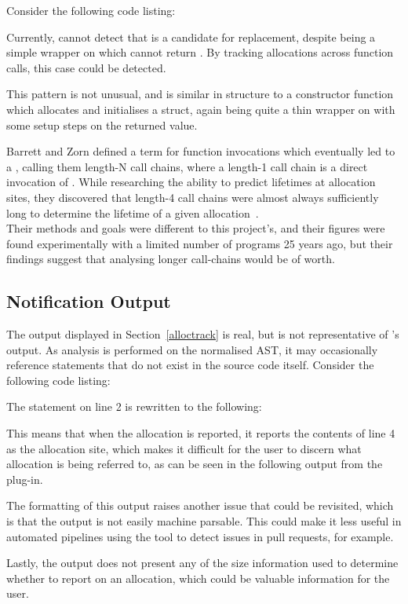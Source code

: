 Consider the following code listing:



Currently,  cannot detect that  is a candidate for replacement, despite  being a simple wrapper on \malloc{} which cannot return . By tracking allocations across function calls, this case could be detected.

This pattern is not unusual, and is similar in structure to a constructor function which allocates and initialises a struct, again being quite a thin wrapper on \malloc{} with some setup steps on the returned value.

Barrett and Zorn defined a term for function invocations which eventually led to a \malloc{}, calling them length-N call chains, where a length-1 call chain is a direct invocation of \malloc{}. While researching the ability to predict lifetimes at allocation sites, they discovered that length-4 call chains were almost always sufficiently long to determine the lifetime of a given allocation~\cite{predictors}. \\
Their methods and goals were different to this project's, and their figures were found experimentally with a limited number of programs 25 years ago, but their findings suggest that analysing longer call-chains would be of worth.

\subsection{Notification Output}

The output displayed in Section~\ref{alloctrack} is real, but is not representative of 's output. As analysis is performed on the normalised AST, it may occasionally reference statements that do not exist in the source code itself. Consider the following code listing:



The statement on line 2 is rewritten to the following:



This means that when the allocation is reported, it reports the contents of line 4 as the allocation site, which makes it difficult for the user to discern what allocation is being referred to, as can be seen in the following output from the plug-in.



The formatting of this output raises another issue that could be revisited, which is that the output is not easily machine parsable. This could make it less useful in automated pipelines using the tool to detect issues in pull requests, for example.

Lastly, the output does not present any of the size information used to determine whether to report on an allocation, which could be valuable information for the user.
